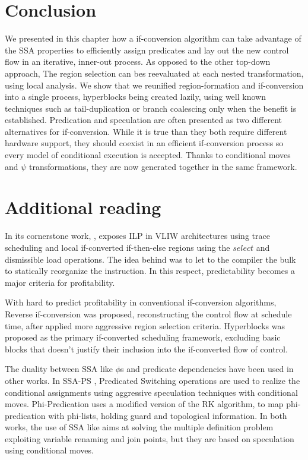 \section{Conclusion} 
We presented in this chapter how a if-conversion algorithm can take advantage of the SSA properties to efficiently assign predicates and lay out the new control flow in an iterative, inner-out process. As opposed to the other top-down approach, The region selection can bes reevaluated at each nested transformation, using local analysis.
We show that we reunified region-formation and if-conversion into a single process, hyperblocks being created lazily, using well known techniques such as tail-duplication or branch coalescing only when the benefit is established.
Predication and speculation are often presented as two different alternatives for if-conversion. While it is true than they both require different hardware support, they should coexist in an efficient if-conversion process so every model of conditional execution is accepted. Thanks to conditional moves and $\psi$ transformations, they are now generated together in the same framework.

\section{Additional reading}

In its cornerstone work, \cite{Rau:2003:IP:1074100.1074489}, exposes ILP in VLIW architectures using trace scheduling and local if-converted if-then-else regions using the $select$ and dismissible load operations. The idea behind was to let to the compiler the bulk to statically reorganize the instruction. In this respect, predictability \cite{Fisher:1992:PCB:143371.143493} becomes a major criteria for profitability.

With hard to predict profitability in conventional if-conversion algorithms, Reverse if-conversion \cite{August:1999:PRI:326224.325595} was proposed, reconstructing the control flow at schedule time, after applied more aggressive region selection criteria.
Hyperblocks \cite{Mahlke:1992:ECS:144965.144998} was proposed as the primary if-converted scheduling framework, excluding basic blocks that doesn't justify their inclusion into the if-converted flow of control.

The duality between SSA like $\phi$s and predicate dependencies have been used in other works. In SSA-PS \cite{Jacome01clusteredvliw}, Predicated Switching operations are used to realize the conditional assignments using aggressive speculation techniques with conditional moves. Phi-Predication \cite{Chuang03phi-predicationfor} uses a modified version of the RK algorithm, to map phi-predication with phi-lists, holding guard and topological information. In both works, the use of SSA like aims at solving the multiple definition problem exploiting variable renaming and join points, but they are based on speculation using conditional moves. 

